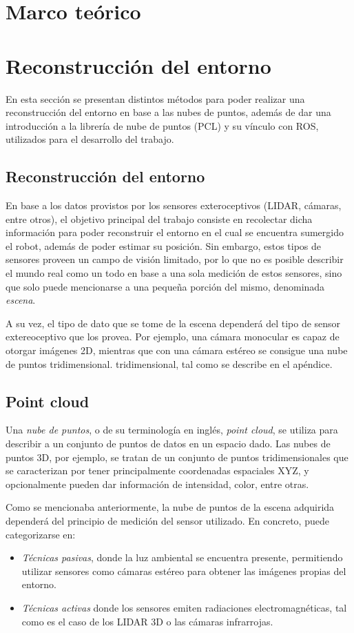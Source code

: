 \ifimagenes
\section{Marco teórico}
\else
\section{Reconstrucción del entorno}
\fi
\label{sec:marcoteorico}
En esta sección se presentan distintos métodos para poder realizar una reconstrucción del entorno en base a las nubes de puntos, además de dar una introducción a la librería de nube de puntos (PCL) y su vínculo con ROS, utilizados para el desarrollo del trabajo.

\ifimagenes
\subsection{Reconstrucción del entorno}
\else
\fi
En base a los datos provistos por los sensores exteroceptivos (LIDAR, cámaras, entre otros), el objetivo principal del trabajo consiste en recolectar dicha información para poder reconstruir el entorno en el cual se encuentra sumergido el robot, además de poder estimar su posición. Sin embargo, estos tipos de sensores proveen un campo de visión limitado, por lo que no es posible describir el mundo real como un todo en base a una sola medición de estos sensores, sino que solo puede mencionarse a una pequeña porción del mismo, denominada \textit{escena}.

A su vez, el tipo de dato que se tome de la escena dependerá del tipo de sensor extereoceptivo que los provea. Por ejemplo, una cámara monocular es capaz de otorgar imágenes 2D, mientras que con una cámara estéreo se consigue una nube de puntos 
\ifimagenes
    \ifimagenespaper
tridimensional.
    \else
tridimensional, tal como se describe en el apéndice.
    \fi
\fi

\subsection{Point cloud}
Una \textit{nube de puntos}, o de su terminología en inglés, \textit{point cloud}, se utiliza para describir a un conjunto de puntos de datos en un espacio dado. Las nubes de puntos 3D, por ejemplo, se tratan de un conjunto de puntos tridimensionales que se caracterizan por tener principalmente coordenadas espaciales XYZ, y opcionalmente pueden dar información de intensidad, color, entre otras.

Como se mencionaba anteriormente, la nube de puntos de la escena adquirida dependerá del principio de medición del sensor utilizado. En concreto, puede categorizarse en: \cite{weinmann2016}
\begin{itemize}
    \item \textit{Técnicas pasivas}, donde la luz ambiental se encuentra presente, permitiendo utilizar sensores como cámaras estéreo para obtener las imágenes propias del entorno.
    \item \textit{Técnicas activas} donde los sensores emiten radiaciones electromagnéticas, tal como es el caso de los LIDAR 3D o las cámaras infrarrojas.
\end{itemize}

